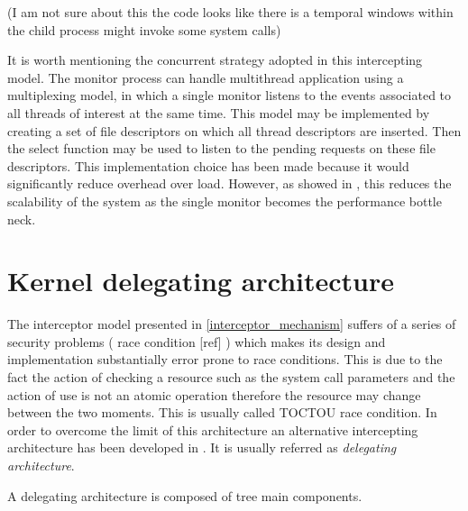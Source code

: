 (I am not sure about this the code looks like there is a temporal windows within the child process might invoke some system calls) 

It is worth mentioning the concurrent strategy adopted in this intercepting model. The monitor process can handle multithread application using a multiplexing model, in which a single monitor listens to the events associated to all threads of interest at the same time. This model may be implemented by creating a set of file descriptors on which all thread descriptors are inserted. Then the select function may be used to listen to the pending requests on these file descriptors.  This implementation choice has been made because it would  significantly reduce overhead over load. However, as showed in \cite{Garfinkel03ostia:a}, this reduces the scalability of the system as the single monitor becomes the performance bottle neck.  


\section{Kernel delegating  architecture}
\label{delegating_architecture}

The interceptor model presented in \ref{interceptor_mechanism} suffers of a series of security problems ( race condition [ref] ) which makes its design and implementation substantially error prone to race conditions. This is due to the fact the action of checking a resource such as the system call parameters and the action of use is not an atomic operation therefore the resource may change between the two moments. This is usually called TOCTOU race condition.  In order to overcome the limit of this architecture an alternative  intercepting architecture has been developed  in \cite{Garfinkel03ostia:a}. It is usually referred as \textit{delegating architecture}. 

A delegating architecture is composed of tree main components. 


